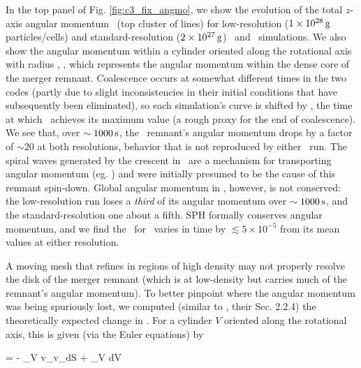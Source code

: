 In the top panel of Fig. \ref{fig:c3_fix_angmo}, we show the evolution of the total $z$-axis angular momentum \Lztot\ (top cluster of lines) for low-resolution ($1\times10^{28}\,\mathrm{g}$ particles/cells) and standard-resolution ($2\times10^{27}\,\mathrm{g}$) \gasoline\ and \arepo\ simulations.  We also show the angular momentum within a cylinder oriented along the rotational axis with radius \innercyl, \Lzinner, which represents the angular momentum within the dense core of the merger remnant.  Coalescence occurs at somewhat different times in the two codes (partly due to slight inconsistencies in their initial conditions that have subsequently been eliminated), so each simulation's curve is shifted by \tlm, the time at which \Lzinner\ achieves its maximum value (a rough proxy for the end of coalescence).  We see that, over $\sim1000\,\mathrm{s}$, the \arepo\ remnant's angular momentum drops by a factor of $\sim20$ at both resolutions, behavior that is not reproduced by either \gasoline\ run.  The spiral waves generated by the crescent in \arepo\ are a mechanism for transporting angular momentum (eg. \citealt{balb03}) and were initially presumed to be the cause of this remnant spin-down.  Global angular momentum in \arepo, however, is not conserved: the low-resolution run loses a \textit{third} of its angular momentum over $\sim1000\,\mathrm{s}$, and the standard-resolution one about a fifth.  SPH formally conserves angular momentum, and we find the \Lztot\ for \gasoline\ varies in time by $\lesssim5\times10^{-5}$ from its mean values at either resolution.


A moving mesh that refines in regions of high density may not properly resolve the disk of the merger remnant (which is at low-density but carries much of the remnant's angular momentum).  To better pinpoint where the angular momentum was being spuriously lost, we computed (similar to \cite{ji+13}, their Sec. 2.2.4) the theoretically expected change in \Lz.  For a cylinder $V$ oriented along the rotational axis, this is given (via the Euler equations) by

\eqbegin
{} = - \oint_V \rho \varpi v_\phi v_\varpi dS + \int_V {\boldmath \varpi}\times{\bf \nabla}\Phi dV
\label{eq:c3_angmobalance}
\eqend

